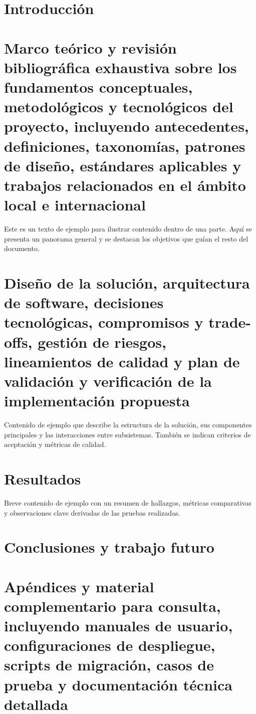 
\part{Introducción}

\part[Marco teórico]{Marco teórico y revisión bibliográfica exhaustiva sobre los fundamentos conceptuales, metodológicos y tecnológicos del proyecto, incluyendo antecedentes, definiciones, taxonomías, patrones de diseño, estándares aplicables y trabajos relacionados en el ámbito local e internacional}
Este es un texto de ejemplo para ilustrar contenido dentro de una parte. Aquí se presenta un panorama general y se destacan los objetivos que guían el resto del documento.

\part[Diseño]{Diseño de la solución, arquitectura de software, decisiones tecnológicas, compromisos y trade-offs, gestión de riesgos, lineamientos de calidad y plan de validación y verificación de la implementación propuesta}
Contenido de ejemplo que describe la estructura de la solución, sus componentes principales y las interacciones entre subsistemas. También se indican criterios de aceptación y métricas de calidad.

\part{Resultados}
Breve contenido de ejemplo con un resumen de hallazgos, métricas comparativas y observaciones clave derivadas de las pruebas realizadas.

\part[Conclusiones]{Conclusiones y trabajo futuro}

\part[Apéndices]{Apéndices y material complementario para consulta, incluyendo manuales de usuario, configuraciones de despliegue, scripts de migración, casos de prueba y documentación técnica detallada}
